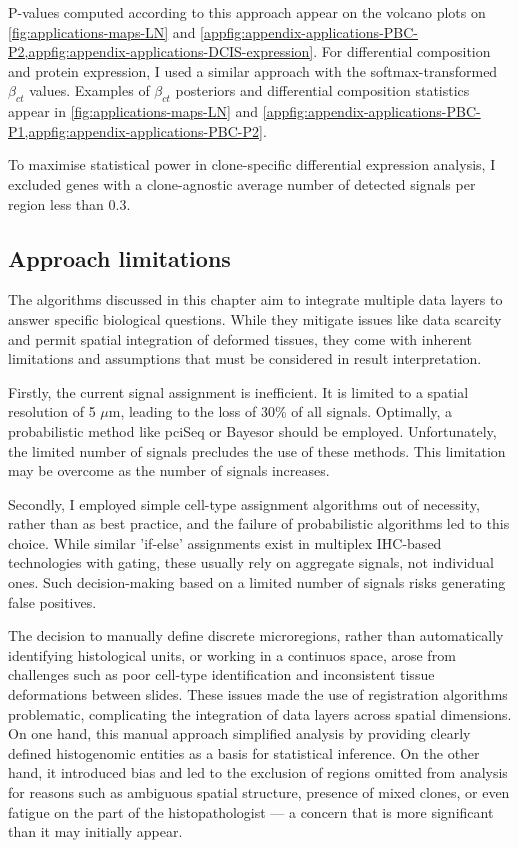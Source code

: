 P-values computed according to this approach appear on the volcano plots on \cref{fig:applications-maps-LN} and \cref{appfig:appendix-applications-PBC-P2,appfig:appendix-applications-DCIS-expression}. For differential composition and protein expression, I used a similar approach with the softmax-transformed $\beta_{ct}$ values. Examples of $\beta_{ct}$ posteriors and differential composition statistics appear in \cref{fig:applications-maps-LN} and \cref{appfig:appendix-applications-PBC-P1,appfig:appendix-applications-PBC-P2}. 

To maximise statistical power in clone-specific differential expression analysis, I excluded genes with a clone-agnostic average number of detected signals per region less than 0.3.

\subsection{Approach limitations}

The algorithms discussed in this chapter aim to integrate multiple data layers to answer specific biological questions. While they mitigate issues like data scarcity and permit spatial integration of deformed tissues, they come with inherent limitations and assumptions that must be considered in result interpretation.

Firstly, the current signal assignment is inefficient. It is limited to a spatial resolution of 5 $\mu$m, leading to the loss of 30\% of all signals. Optimally, a probabilistic method like pciSeq \parencite{Qian2020-mp} or Bayesor \parencite{Petukhov2022-pv} should be employed. Unfortunately, the limited number of signals precludes the use of these methods. This limitation may be overcome as the number of signals increases.

Secondly, I employed simple cell-type assignment algorithms out of necessity, rather than as best practice, and the failure of probabilistic algorithms led to this choice. While similar 'if-else' assignments exist in multiplex \ac{IHC}-based technologies with gating, these usually rely on aggregate signals, not individual ones. Such decision-making based on a limited number of signals risks generating false positives.

The decision to manually define discrete microregions, rather than automatically identifying histological units, or working in a continuos space, arose from challenges such as poor cell-type identification and inconsistent tissue deformations between slides. These issues made the use of registration algorithms problematic, complicating the integration of data layers across spatial dimensions. On one hand, this manual approach simplified analysis by providing clearly defined histogenomic entities as a basis for statistical inference. On the other hand, it introduced bias and led to the exclusion of regions omitted from analysis for reasons such as ambiguous spatial structure, presence of mixed clones, or even fatigue on the part of the histopathologist — a concern that is more significant than it may initially appear.

